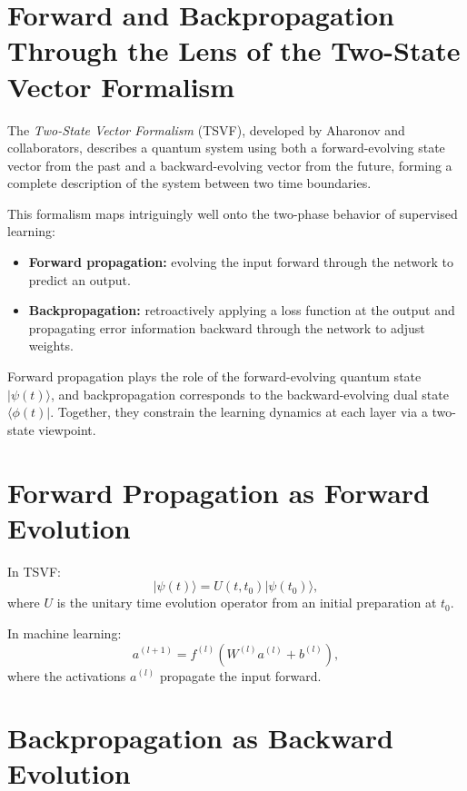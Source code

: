 {{{{{{%

\section{Forward and Backpropagation Through the Lens of the Two-State Vector Formalism}

The \emph{Two-State Vector Formalism} (TSVF), developed by Aharonov and collaborators, describes a quantum system using both a forward-evolving state vector from the past and a backward-evolving vector from the future, forming a complete description of the system between two time boundaries.

This formalism maps intriguingly well onto the two-phase behavior of supervised learning:

\begin{itemize}
  \item \textbf{Forward propagation:} evolving the input forward through the network to predict an output.
  \item \textbf{Backpropagation:} retroactively applying a loss function at the output and propagating error information backward through the network to adjust weights.
\end{itemize}

\begin{highlightbox}
Forward propagation plays the role of the forward-evolving quantum state \(|\psi(t)\rangle\), and backpropagation corresponds to the backward-evolving dual state \(\langle \phi(t)|\). Together, they constrain the learning dynamics at each layer via a two-state viewpoint.
\end{highlightbox}

\section{Forward Propagation as Forward Evolution}

In TSVF:
\[
|\psi(t)\rangle = U(t, t_0) |\psi(t_0)\rangle,
\]
where \(U\) is the unitary time evolution operator from an initial preparation at \(t_0\).

In machine learning:
\[
a^{(l+1)} = f^{(l)}(W^{(l)} a^{(l)} + b^{(l)}),
\]
where the activations \(a^{(l)}\) propagate the input forward.

\section{Backpropagation as Backward Evolution}

}}}}}}
